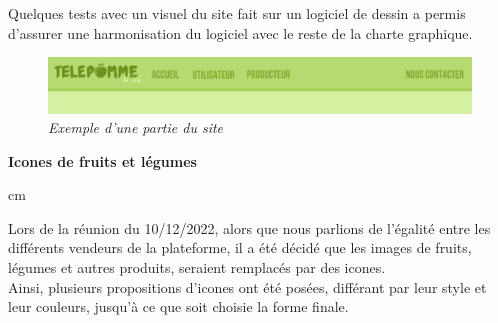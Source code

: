 \documentclass[12pt]{article}
\begin{document}
    Quelques tests avec un visuel du site fait sur un logiciel de dessin a permis d'assurer une harmonisation du logiciel avec le reste de la charte graphique.

    \begin{figure}[h!]
        \centering
        \includegraphics[scale = 0.12]{static/0 - Barre exemple.png}
        \small{\emph{Exemple d'une partie du site}}
        \label{fig:Ex_site}
    \end{figure}


    \newpage


    \begin{large}
        \textbf{Icones de fruits et légumes}
    \end{large}

     cm

    Lors de la réunion du 10/12/2022, alors que nous parlions de l'égalité entre les différents vendeurs de la plateforme, il a été décidé que les images de fruits, légumes et autres produits, seraient remplacés par des icones.\\
    Ainsi, plusieurs propositions d'icones ont été posées, différant par leur style et leur couleurs, jusqu'à ce que soit choisie la forme finale.
\end{document}
